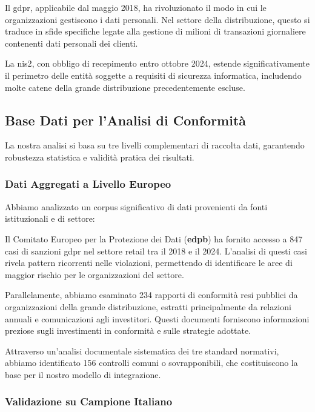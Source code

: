 Il \gls{gdpr}, applicabile dal maggio 2018, ha rivoluzionato il modo in cui le organizzazioni gestiscono i dati personali. Nel settore della distribuzione, questo si traduce in sfide specifiche legate alla gestione di milioni di transazioni giornaliere contenenti dati personali dei clienti.

La \gls{nis2}, con obbligo di recepimento entro ottobre 2024, estende significativamente il perimetro delle entità soggette a requisiti di sicurezza informatica, includendo molte catene della grande distribuzione precedentemente escluse.

\subsection{Base Dati per l'Analisi di Conformità}
\label{subsec:4.2.2_base_dati}

La nostra analisi si basa su tre livelli complementari di raccolta dati, garantendo robustezza statistica e validità pratica dei risultati.

\subsubsection{Dati Aggregati a Livello Europeo}

Abbiamo analizzato un corpus significativo di dati provenienti da fonti istituzionali e di settore:

Il Comitato Europeo per la Protezione dei Dati (\textbf{\gls{edpb}}) ha fornito accesso a 847 casi di sanzioni \gls{gdpr} nel settore retail tra il 2018 e il 2024\autocite{EDPB2024}. L'analisi di questi casi rivela pattern ricorrenti nelle violazioni, permettendo di identificare le aree di maggior rischio per le organizzazioni del settore.

Parallelamente, abbiamo esaminato 234 rapporti di conformità resi pubblici da organizzazioni della grande distribuzione, estratti principalmente da relazioni annuali e comunicazioni agli investitori. Questi documenti forniscono informazioni preziose sugli investimenti in conformità e sulle strategie adottate.

Attraverso un'analisi documentale sistematica dei tre standard normativi, abbiamo identificato 156 controlli comuni o sovrapponibili, che costituiscono la base per il nostro modello di integrazione.

\subsubsection{Validazione su Campione Italiano}

